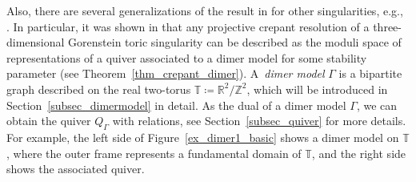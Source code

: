 \documentclass[pdftex]{sigma}
\numberwithin{equation}{section}
\theoremstyle{definition}
\newcommand{\ZZ}{\mathbb{Z}}
\newcommand{\RR}{\mathbb{R}}
\newcommand{\TT}{\mathbb{T}}
\begin{document}
Also, there are several generalizations of the result in \cite{CrawIshii} for other singularities, e.g., \cite{IU_anycrepant,Jung_CIconj,Wem_MMP}.
In particular, it was shown in \cite{IU_anycrepant} that any projective crepant resolution of a three-dimensional Gorenstein toric singularity can be
described as the moduli space of representations of a quiver associated to a dimer model for some stability parameter (see Theorem~\ref{thm_crepant_dimer}).
A~\emph{dimer model} $\Gamma$ is a bipartite graph described on the real two-torus $\TT\coloneqq\RR^2/\ZZ^2$, which will be introduced in Section~\ref{subsec_dimermodel} in detail.
As the dual of a dimer model $\Gamma$, we can obtain the quiver $Q_\Gamma$ with relations, see Section~\ref{subsec_quiver} for more details.
For example, the left side of Figure~\ref{ex_dimer1_basic} shows a dimer model on $\TT$, where the outer frame represents a fundamental domain of $\TT$, and the right side shows the associated quiver.

\newcommand{\basicdimerA}{
\foreach \n/\a/\b in {1/1.5/3, 2/3.5/3, 3/5.5/3, 4/7.5/3} {\coordinate (B\n) at (\a,\b);}
\foreach \n/\a/\b in {1/0.5/1,2/2.5/1, 3/4.5/1, 4/6.5/1} {\coordinate (W\n) at (\a,\b);}
\draw[line width=\edgewidth] (0,0) rectangle (8,4);
\foreach \w/\b in {1/1,2/2,3/3,4/3} {\draw[line width=\edgewidth] (W\w)--(B\b); }
\foreach \w/\s/\t in {1/0/2,1/0/0,1/1/0,2/2/0,2/3/0,3/4/0,3/5/0,4/6/0,4/7/0} {\draw[line width=\edgewidth] (W\w)--(\s,\t); }
\foreach \b/\s/\t in {1/1/4,1/2/4,2/3/4,2/4/4,3/5/4,3/6/4,4/7/4,4/8/4,4/8/2} {\draw[line width=\edgewidth] (B\b)--(\s,\t); }
\foreach \x in {1,2,3,4} {\filldraw [fill=black, line width=\nodewidthb] (B\x) circle [radius=\noderad] ;}
\foreach \x in {1,2,3,4} {\filldraw [fill=white, line width=\nodewidthw] (W\x) circle [radius=\noderad] ;}
}
\end{document}
